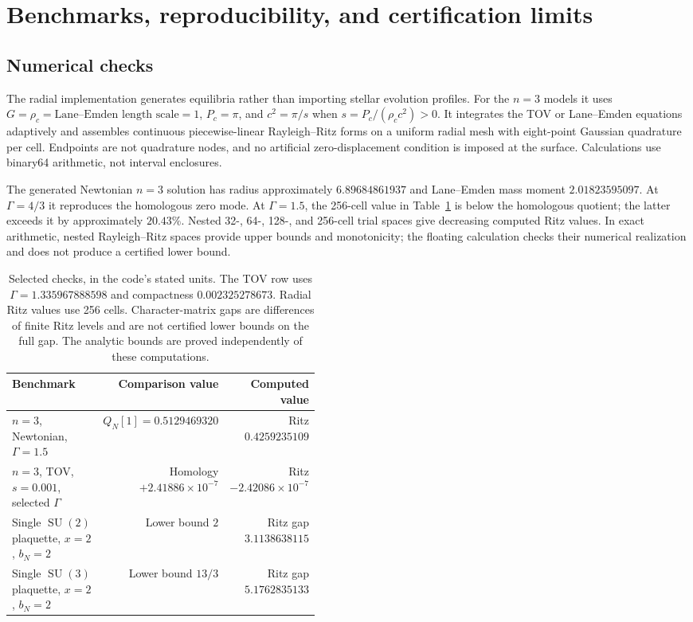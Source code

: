 \documentclass[11pt,letterpaper]{article}
\newcommand{\SU}{\operatorname{SU}}
\theoremstyle{definition}
\numberwithin{equation}{section}
\begin{document}
\section{Benchmarks, reproducibility, and certification limits}
\label{sec:reproduce}

\subsection{Numerical checks}

The radial implementation generates equilibria rather than importing
stellar evolution profiles. For the $n=3$ models it uses
$G=\rho_c=\text{Lane--Emden length scale}=1$, $P_c=\pi$, and
$c^2=\pi/s$ when $s=P_c/(\rho_cc^2)>0$. It integrates the TOV or
Lane--Emden equations adaptively and assembles continuous piecewise-linear
Rayleigh--Ritz forms on a uniform radial mesh with eight-point Gaussian
quadrature per cell. Endpoints are not quadrature nodes, and no artificial
zero-displacement condition is imposed at the surface. Calculations use
binary64 arithmetic, not interval enclosures.

The generated Newtonian $n=3$ solution has radius approximately
$6.89684861937$ and Lane--Emden mass moment $2.01823595097$. At
$\Gamma=4/3$ it reproduces the homologous zero mode. At $\Gamma=1.5$,
the 256-cell value in Table~\ref{tab:benchmarks} is below the homologous
quotient; the latter exceeds it by approximately $20.43\%$. Nested
32-, 64-, 128-, and 256-cell trial spaces give decreasing computed Ritz
values. In exact arithmetic, nested Rayleigh--Ritz spaces provide upper
bounds and monotonicity; the floating calculation checks their numerical
realization and does not produce a certified lower bound.

\begin{table}[htbp]
\centering\small
\begin{tabular}{@{}p{0.45\linewidth}rr@{}}
\toprule
Benchmark & Comparison value & Computed value\\
\midrule
$n=3$, Newtonian, $\Gamma=1.5$
 & $Q_N[1]=0.5129469320$ & Ritz $0.4259235109$\\[3pt]
$n=3$, TOV, $s=0.001$, selected $\Gamma$
 & Homology $+2.41886\!\times\!10^{-7}$
 & Ritz $-2.42086\!\times\!10^{-7}$\\[3pt]
Single $\SU(2)$ plaquette, $x=2$, $b_N=2$
 & Lower bound $2$ & Ritz gap $3.1138638115$\\[3pt]
Single $\SU(3)$ plaquette, $x=2$, $b_N=2$
 & Lower bound $13/3$ & Ritz gap $5.1762835133$\\
\bottomrule
\end{tabular}
\caption{Selected checks, in the code's stated units. The TOV row uses
$\Gamma=1.335967888598$ and compactness $0.002325278673$. Radial Ritz
values use 256 cells. Character-matrix gaps are differences of finite
Ritz levels and are not certified lower bounds on the full gap. The
analytic bounds are proved independently of these computations.}
\label{tab:benchmarks}
\end{table}
\end{document}
